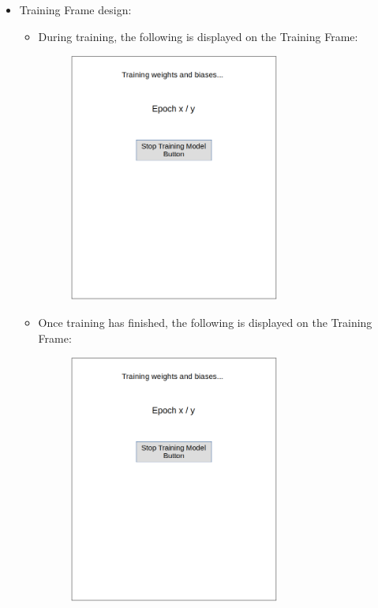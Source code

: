 \documentclass[./project-report/src/latex/project-report.tex]{subfiles}
\begin{document}
\begin{itemize}
    \pagebreak

    \item Training Frame design:
        \begin{itemize}
            \item During training, the following is displayed on the Training Frame:
                \begin{figure}[h!]
                \centering
                \includegraphics[width=0.7\textwidth]{./project-report/src/images/training-frame-1-design.png}
                \end{figure}

            \pagebreak

            \item Once training has finished, the following is displayed on the Training Frame:
                \begin{figure}[h!]
                \centering
                \includegraphics[width=0.7\textwidth]{./project-report/src/images/training-frame-1-design.png}
                \end{figure}
            \end{itemize}


\end{itemize}
\end{document}
